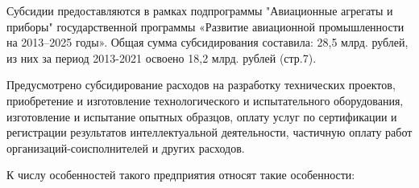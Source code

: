 Субсидии предоставляются в рамках подпрограммы "Авиационные агрегаты и приборы" государственной программы «Развитие авиационной промышленности на 2013–2025 годы». Общая сумма субсидирования составила: 28,5 млрд. рублей, из них за период 2013-2021 освоено 18,2 млрд. рублей (стр.7).

Предусмотрено субсидирование расходов на разработку технических проектов, приобретение и изготовление технологического и испытательного оборудования, изготовление и испытание опытных образцов, оплату услуг по сертификации и регистрации результатов интеллектуальной деятельности, частичную оплату работ организаций-соисполнителей и других расходов.

К числу особенностей такого предприятия относят такие особенности:

\pagebreak